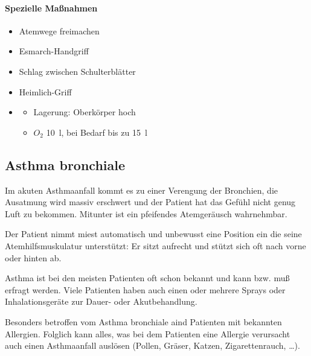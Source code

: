 \begin{gMassnahmenEnv}
    \paragraph{Spezielle Maßnahmen}
    
    \begin{itemize}
        \item Atemwege freimachen
        \item Esmarch-Handgriff
        \item Schlag zwischen Schulterblätter
        \item Heimlich-Griff
        \item \gTxBeiVit \gTxMassVitBes 
        \begin{itemize}
            \item Lagerung: Oberk\"orper hoch
            \item $O_2$ 10~l, bei Bedarf bis zu 15~l
        \end{itemize}
    \end{itemize}
    
\end{gMassnahmenEnv}



\subsection{Asthma bronchiale}


Im akuten Asthmaanfall kommt es zu einer Verengung der
Bronchien, die Ausatmung wird massiv erschwert und der
Patient hat das Gefühl nicht genug Luft zu bekommen.
Mitunter ist ein pfeifendes Atemgeräusch wahrnehmbar. 

Der Patient nimmt miest automatisch und unbewusst eine
Position ein die seine Atemhilfsmuskulatur unterstützt: Er
sitzt aufrecht und stützt sich oft nach vorne oder hinten
ab. 

Asthma ist bei den meisten Patienten oft schon bekannt und
kann bzw. muß erfragt werden. Viele Patienten haben auch
einen oder mehrere Sprays oder Inhalationsgeräte zur Dauer-
oder Akutbehandlung.  

Besonders betroffen vom Asthma bronchiale aind Patienten
mit bekannten Allergien. Folglich kann alles, was bei dem
Patienten eine Allergie verursacht auch einen Asthmaanfall
auslösen (Pollen, Gräser, Katzen, Zigarettenrauch, \ldots). 

